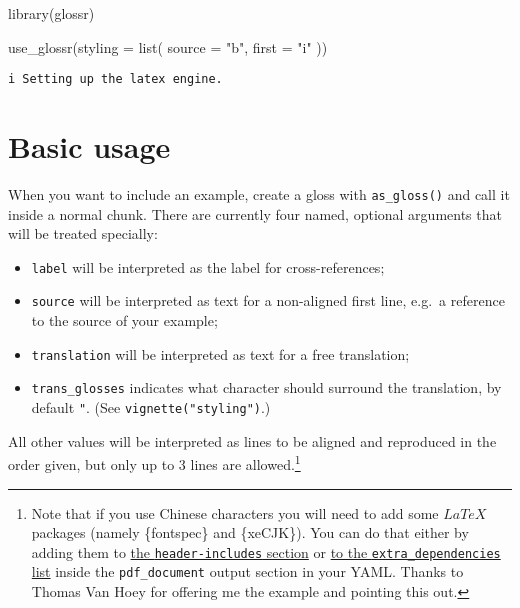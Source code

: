 \documentclass[
  letterpaper,
  DIV=11,
  numbers=noendperiod]{scrartcl}
\newenvironment{Shaded}{\begin{snugshade}}{\end{snugshade}}
\newcommand{\AttributeTok}[1]{\textcolor[rgb]{0.40,0.45,0.13}{#1}}
\newcommand{\FunctionTok}[1]{\textcolor[rgb]{0.28,0.35,0.67}{#1}}
\newcommand{\NormalTok}[1]{\textcolor[rgb]{0.00,0.23,0.31}{#1}}
\newcommand{\StringTok}[1]{\textcolor[rgb]{0.13,0.47,0.30}{#1}}
\begin{document}
\begin{Shaded}
\begin{Highlighting}[]
\FunctionTok{library}\NormalTok{(glossr)}
\end{Highlighting}
\end{Shaded}

\begin{Shaded}
\begin{Highlighting}[]
\FunctionTok{use\_glossr}\NormalTok{(}\AttributeTok{styling =} \FunctionTok{list}\NormalTok{(}
  \AttributeTok{source =} \StringTok{"b"}\NormalTok{,}
  \AttributeTok{first =} \StringTok{"i"}
\NormalTok{))}
\end{Highlighting}
\end{Shaded}

\begin{verbatim}
i Setting up the latex engine.
\end{verbatim}

\hypertarget{basic-usage}{%
\section{Basic usage}\label{basic-usage}}

When you want to include an example, create a gloss with
\texttt{as\_gloss()} and call it inside a normal chunk. There are
currently four named, optional arguments that will be treated specially:

\begin{itemize}
\item
  \texttt{label} will be interpreted as the label for cross-references;
\item
  \texttt{source} will be interpreted as text for a non-aligned first
  line, e.g.~a reference to the source of your example;
\item
  \texttt{translation} will be interpreted as text for a free
  translation;
\item
  \texttt{trans\_glosses} indicates what character should surround the
  translation, by default \texttt{"}. (See
  \texttt{vignette("styling")}.)
\end{itemize}

All other values will be interpreted as lines to be aligned and
reproduced in the order given, but only up to 3 lines are
allowed.\footnote{Note that if you use Chinese characters you will need
  to add some \(LaTeX\) packages (namely \{fontspec\} and \{xeCJK\}).
  You can do that either by adding them to
  \href{https://bookdown.org/yihui/rmarkdown-cookbook/latex-preamble.html}{the
  \texttt{header-includes} section} or
  \href{https://bookdown.org/yihui/rmarkdown-cookbook/latex-extra.html}{to
  the \texttt{extra\_dependencies} list} inside the
  \texttt{pdf\_document} output section in your YAML. Thanks to Thomas
  Van Hoey for offering me the example and pointing this out.}
\end{document}
